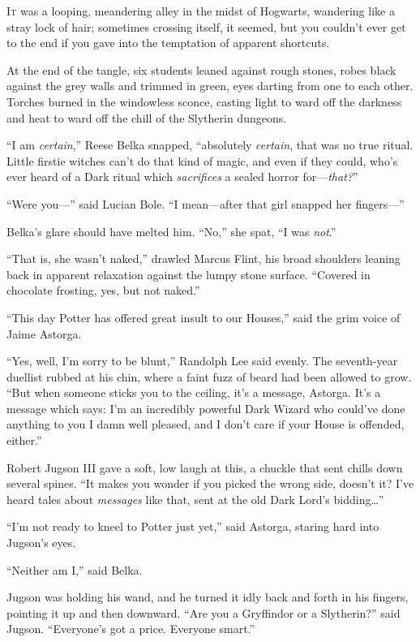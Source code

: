 
\lettrine{I}{t} was a looping, meandering alley in the midst of Hogwarts, wandering like a stray lock of hair; sometimes crossing itself, it seemed, but you couldn’t ever get to the end if you gave into the temptation of apparent shortcuts.

At the end of the tangle, six students leaned against rough stones, robes black against the grey walls and trimmed in green, eyes darting from one to each other. Torches burned in the windowless sconce, casting light to ward off the darkness and heat to ward off the chill of the Slytherin dungeons.

“I am \emph{certain},” Reese Belka snapped, “absolutely \emph{certain}, that was no true ritual. Little firstie witches can’t do that kind of magic, and even if they could, who’s ever heard of a Dark ritual which \emph{sacrifices} a sealed horror for—\emph{that?}”

“Were you—” said Lucian Bole.
“I mean—after that girl snapped her fingers—”

Belka’s glare should have melted him.
“No,” she spat,
“I was \emph{not}.”

“That is, she wasn’t naked,” drawled Marcus Flint, his broad shoulders leaning back in apparent relaxation against the lumpy stone surface.
“Covered in chocolate frosting, yes, but not naked.”

“This day Potter has offered great insult to our Houses,” said the grim voice of Jaime Astorga.

“Yes, well, I’m sorry to be blunt,” Randolph Lee said evenly. The seventh-year duellist rubbed at his chin, where a faint fuzz of beard had been allowed to grow.
“But when someone sticks you to the ceiling, it’s a message, Astorga. It’s a message which says: I’m an incredibly powerful Dark Wizard who could’ve done anything to you I damn well pleased, and I don’t care if your House is offended, either.”

Robert Jugson III gave a soft, low laugh at this, a chuckle that sent chills down several spines.
“It makes you wonder if you picked the wrong side, doesn’t it? I’ve heard tales about \emph{messages} like that, sent at the old Dark Lord’s bidding…”

“I’m not ready to kneel to Potter just yet,” said Astorga, staring hard into Jugson’s eyes.

“Neither am I,” said Belka.

Jugson was holding his wand, and he turned it idly back and forth in his fingers, pointing it up and then downward.
“Are you a Gryffindor or a Slytherin?” said Jugson.
“Everyone’s got a price. Everyone smart.”

